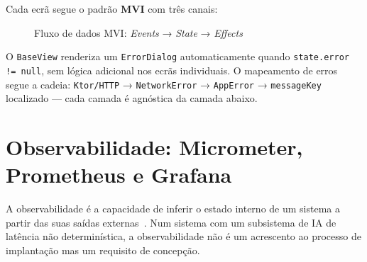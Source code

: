 Cada ecrã segue o padrão \textbf{MVI} com três canais:

\begin{figure}[htbp]
  \centering
  \caption{Fluxo de dados MVI: \textit{Events} → \textit{State} → \textit{Effects}}
  \label{fig:mvi_fluxo}
\end{figure}

O \texttt{BaseView} renderiza um \texttt{ErrorDialog} automaticamente
quando \texttt{state.error != null}, sem lógica adicional nos ecrãs
individuais.
O mapeamento de erros segue a cadeia:
\texttt{Ktor/HTTP} → \texttt{NetworkError} → \texttt{AppError}
→ \texttt{messageKey} localizado — cada camada é agnóstica da camada
abaixo.

\section{Observabilidade: Micrometer, Prometheus e Grafana}
\label{sec:dd_observabilidade}

A observabilidade é a capacidade de inferir o estado interno de um sistema
a partir das suas saídas externas~\cite{humble2018accelerate}.
Num sistema com um subsistema de IA de latência não determinística, a
observabilidade não é um acrescento ao processo de implantação mas um
requisito de concepção.


